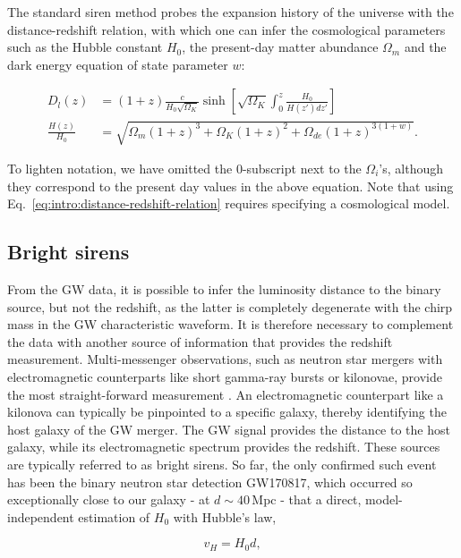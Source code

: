 \documentclass[%
preprint,
nofootinbib,
 amsmath,amssymb,
 aps,
]{revtex4-2}
\begin{document}
The standard siren method probes the expansion history of the universe with the distance-redshift
relation, with which one can infer the cosmological parameters such as the Hubble constant $H_0$,
the present-day matter abundance $\Omega_m$ and the dark energy equation of state parameter
$w$:~\cite{Hogg:1999ad}

\begin{align}
	\label{eq:intro:distance-redshift-relation}
	D_l(z)           & = (1+z)\frac{c}{H_0 \sqrt{\Omega_{K}}} \sinh \left[ \sqrt{\Omega_{K}} \int_0^z \frac{H_0}{H(z') dz'}\right] \\
	\nonumber
	\frac{H(z)}{H_0} & = \sqrt{\Omega_m (1+z)^3 + \Omega_K (1+z)^2 + \Omega_{de} (1+z)^{3(1+w)}}.
\end{align}

To lighten notation, we have omitted the 0-subscript next to the $\Omega_i$'s, although they
correspond to the present day values in the above equation. Note that using
Eq.~\eqref{eq:intro:distance-redshift-relation} requires specifying a cosmological model.

\subsection{Bright sirens}

From the GW data, it is possible to infer the luminosity distance to the binary source, but not the
redshift, as the latter is completely degenerate with the chirp mass in the GW characteristic
waveform. It is therefore necessary to complement the data with another source of information that
provides the redshift measurement. Multi-messenger observations, such as neutron star mergers with
electromagnetic counterparts like short gamma-ray bursts or kilonovae, provide the most
straight-forward measurement \cite{Holz:2005df,Dalal:2006qt}. An electromagnetic counterpart like a
kilonova can typically be pinpointed to a specific galaxy, thereby identifying the host galaxy of
the GW merger. The GW signal provides the distance to the host galaxy, while its electromagnetic
spectrum provides the redshift. These sources are typically referred to as bright sirens. So far,
the only confirmed such event has been the binary neutron star detection GW170817, which occurred
so exceptionally close to our galaxy - at $d \sim 40 \,$Mpc - that a direct, model-independent
estimation of $H_0$ with Hubble's law,

\begin{equation}
	v_H = H_0 d,
\end{equation}
\end{document}
